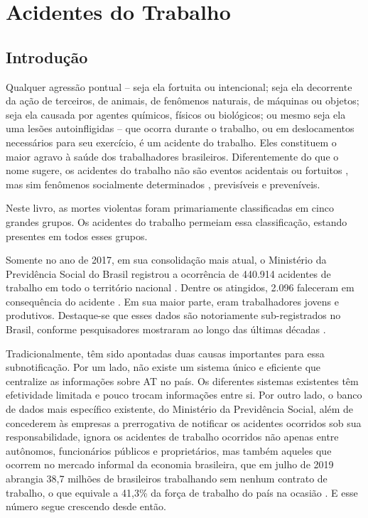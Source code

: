 



\chapter{Acidentes do Trabalho}

\section{Introdução}

Qualquer agressão pontual – seja ela fortuita ou intencional; seja ela decorrente da ação de terceiros, de animais, de fenômenos naturais, de máquinas ou objetos; seja ela causada por agentes químicos, físicos ou biológicos; ou mesmo seja ela uma lesões autoinfligidas – que ocorra durante o trabalho, ou em deslocamentos necessários para seu exercício, é um acidente do trabalho. Eles constituem o maior agravo à saúde dos trabalhadores brasileiros. Diferentemente do que o nome sugere, os acidentes do trabalho não são eventos acidentais ou fortuitos \citep{tsai1991relationship}, mas sim fenômenos socialmente determinados \citep{dwyer2013life}, previsíveis e preveníveis.

Neste livro, as mortes violentas foram primariamente classificadas em cinco grandes grupos. Os acidentes do trabalho permeiam essa classificação, estando presentes em todos esses grupos.

Somente no ano de 2017, em sua consolidação mais atual, o Ministério da Previdência Social do Brasil registrou a ocorrência de 440.914 acidentes de trabalho em todo o território nacional \citep{social2019anuario}. Dentre os atingidos, 2.096 faleceram em consequência do acidente \citep{social2019anuario}. Em sua maior parte, eram trabalhadores jovens e produtivos. Destaque-se que esses dados são notoriamente sub-registrados no Brasil, conforme pesquisadores mostraram ao longo das últimas décadas\citep{possas1987avaliaccao} \citep{lucca1994acidentes}\citep{santana2005acidentes}\citep{cordeiro2006incidencia}.

Tradicionalmente, têm sido apontadas duas causas importantes para essa subnotificação. Por um lado, não existe um sistema único e eficiente que centralize as informações sobre AT no país. Os diferentes sistemas existentes têm efetividade limitada e pouco trocam informações entre si. Por outro lado, o banco de dados mais específico existente, do Ministério da Previdência Social, além de concederem às empresas a prerrogativa de notificar os acidentes ocorridos sob sua responsabilidade, ignora os acidentes de trabalho ocorridos não apenas entre autônomos, funcionários públicos e proprietários, mas também
aqueles que ocorrem no mercado informal da economia brasileira, que em julho de 2019 abrangia 38,7 milhões de brasileiros trabalhando sem nenhum contrato de trabalho, o que equivale a 41,3\% da força de trabalho do país na ocasião \citep{globo2020}. E esse número segue crescendo desde então.
    
